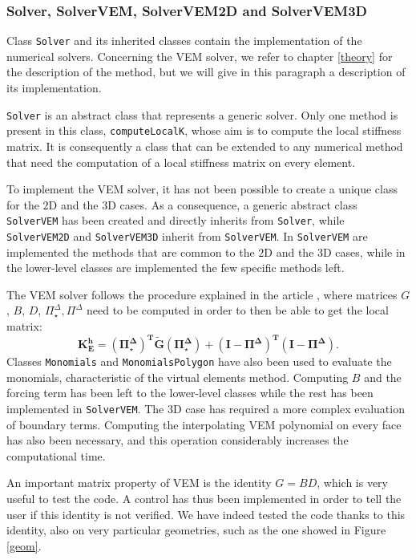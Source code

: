 \subsubsection{Solver, SolverVEM, SolverVEM2D and SolverVEM3D}
Class \verb|Solver| and its inherited classes contain the implementation of the numerical solvers. Concerning the VEM solver, we refer to chapter \ref{theory} for the description of the method, but we will give in this paragraph a description of its implementation. 

\verb|Solver| is an abstract class that represents a generic solver. Only one method is present in this class, \verb|computeLocalK|, whose aim is to compute the local stiffness matrix. It is consequently a class that can be extended to any numerical method that need the computation of a local stiffness matrix on every element. 

To implement the VEM solver, it has not been possible to create a unique class for the $2$D and the $3$D cases. As a consequence, a generic abstract class \verb|SolverVEM| has been created and directly inherits from \verb|Solver|, while \verb|SolverVEM2D| and \verb|SolverVEM3D| inherit from \verb|SolverVEM|. In \verb|SolverVEM| are implemented the methods that are common to the $2$D and the $3$D cases, while in the lower-level classes are implemented the few specific methods left. 

The VEM solver follows the procedure explained in the article \cite{hitchhicker}, where matrices $G$, $B$, $D$, $\Pi_\star^\Delta,\Pi^\Delta$ need to be computed in order to then be able to get the local matrix:
$$ \mathbf{K_E^h= (\Pi^\Delta_\star)^T \tilde{G}
  (\Pi^\Delta_\star)+(I-\Pi^\Delta)^T (I-\Pi^\Delta)}. $$ 
Classes \verb|Monomials| and \verb|MonomialsPolygon| have also been used to evaluate the monomials, characteristic of the virtual elements method. Computing $B$ and the forcing term has been left to the lower-level classes while the rest has been implemented in \verb|SolverVEM|. The $3$D case has required a more complex evaluation of boundary terms. Computing the interpolating VEM polynomial on every face has also been necessary, and this operation considerably increases the computational time. 

An important matrix property of VEM is the identity $G = BD$, which is very useful to test the code. A control has thus been implemented in order to tell the user if this identity is not verified. We have indeed tested the code thanks to this identity, also on very particular geometries, such as the one showed in Figure \ref{geom}. \\

